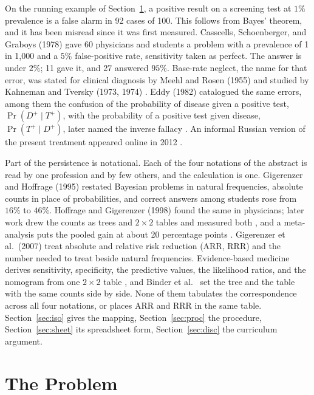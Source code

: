 \documentclass[11pt]{article}
\begin{document}
On the running example of Section~\ref{sec:problem}, a positive result on a screening test at $1\%$ prevalence is a false alarm in 92 cases of 100. This follows from Bayes' theorem, and it has been misread since it was first measured. Casscells, Schoenberger, and Graboys (1978) \cite{casscells1978} gave 60 physicians and students a problem with a prevalence of 1 in 1{,}000 and a $5\%$ false-positive rate, sensitivity taken as perfect. The answer is under $2\%$; 11 gave it, and 27 answered $95\%$. Base-rate neglect, the name for that error, was stated for clinical diagnosis by Meehl and Rosen (1955) \cite{meehl1955} and studied by Kahneman and Tversky (1973, 1974) \cite{kahneman1973, tversky1974}. Eddy (1982) \cite{eddy1982} catalogued the same errors, among them the confusion of the probability of disease given a positive test, $\Pr(D^+ \mid T^+)$, with the probability of a positive test given disease, $\Pr(T^+ \mid D^+)$, later named the inverse fallacy \cite{koehler1996, villejoubert2002}. An informal Russian version of the present treatment appeared online in 2012 \cite{lj2012}.

Part of the persistence is notational. Each of the four notations of the abstract is read by one profession and by few others, and the calculation is one. Gigerenzer and Hoffrage (1995) \cite{gigerenzer1995} restated Bayesian problems in natural frequencies, absolute counts in place of probabilities, and correct answers among students rose from $16\%$ to $46\%$. Hoffrage and Gigerenzer (1998) \cite{hoffrage1998} found the same in physicians; later work drew the counts as trees and $2\times 2$ tables and measured both \cite{binder2015, binder2018, binder2021, kunzelmann2022}, and a meta-analysis puts the pooled gain at about 20 percentage points \cite{mcdowell2017}. Gigerenzer et al.\ (2007) \cite{gigerenzer2007} treat absolute and relative risk reduction (ARR, RRR) and the number needed to treat beside natural frequencies. Evidence-based medicine derives sensitivity, specificity, the predictive values, the likelihood ratios, and the nomogram from one $2\times 2$ table \cite{jaeschke1994}, and Binder et al.\ \cite{binder2015} set the tree and the table with the same counts side by side. None of them tabulates the correspondence across all four notations, or places ARR and RRR in the same table. Section~\ref{sec:iso} gives the mapping, Section~\ref{sec:proc} the procedure, Section~\ref{sec:sheet} its spreadsheet form, Section~\ref{sec:disc} the curriculum argument.

\section{The Problem}
\label{sec:problem}
\end{document}
